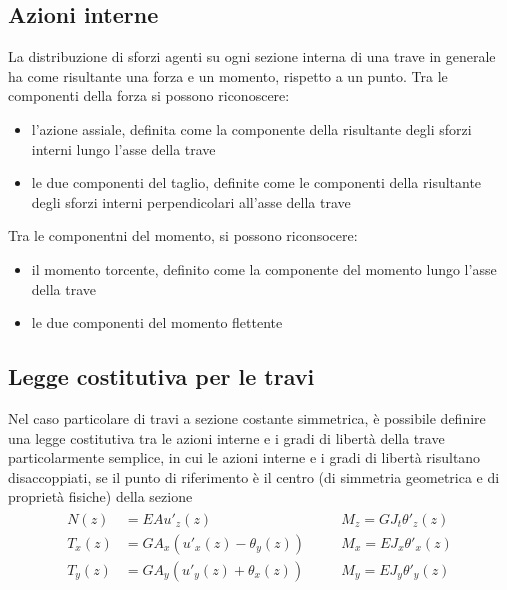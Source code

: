 \documentclass[letterpaper,10pt,italian]{jupyterBook}
\begin{document}
\subsection{Azioni interne}
\label{\detokenize{ch/continuum/solids:azioni-interne}}\label{\detokenize{ch/continuum/solids:contiuum-solids-beam-internal-actions}}
\sphinxAtStartPar
La distribuzione di sforzi agenti su ogni sezione interna di una trave in generale ha come risultante una forza e un momento, rispetto a un punto.
Tra le componenti della forza si possono riconoscere:
\begin{itemize}
\item {} 
\sphinxAtStartPar
l’azione assiale, definita come la componente della risultante degli sforzi interni lungo l’asse della trave

\item {} 
\sphinxAtStartPar
le due componenti del taglio, definite come le componenti della risultante degli sforzi interni perpendicolari all’asse della trave

\end{itemize}

\sphinxAtStartPar
Tra le componentni del momento, si possono riconsocere:
\begin{itemize}
\item {} 
\sphinxAtStartPar
il momento torcente, definito come la componente del momento lungo l’asse della trave

\item {} 
\sphinxAtStartPar
le due componenti del momento flettente

\end{itemize}


\subsection{Legge costitutiva \sphinxhyphen{} per le travi}
\label{\detokenize{ch/continuum/solids:legge-costitutiva-per-le-travi}}\label{\detokenize{ch/continuum/solids:contiuum-solids-beam-constitutive-law}}
\sphinxAtStartPar
Nel caso particolare di travi a sezione costante simmetrica, è possibile definire una legge costitutiva tra le azioni interne e i gradi di libertà della trave particolarmente semplice, in cui le azioni interne e i gradi di libertà risultano disaccoppiati, se il punto di riferimento è il centro (di simmetria geometrica e di proprietà fisiche) della sezione
\begin{equation*}
\begin{split}\begin{aligned}
  N  (z) & = EA   u'_z(z)                               && \quad M_z = GJ_t \theta'_z(z) \\
  T_x(z) & = GA_x \left( u'_x(z) - \theta_y(z) \right)  && \quad M_x = EJ_x \theta'_x(z) \\
  T_y(z) & = GA_y \left( u'_y(z) + \theta_x(z) \right)  && \quad M_y = EJ_y \theta'_y(z) \\
\end{aligned}\end{split}
\end{equation*}
\end{document}
